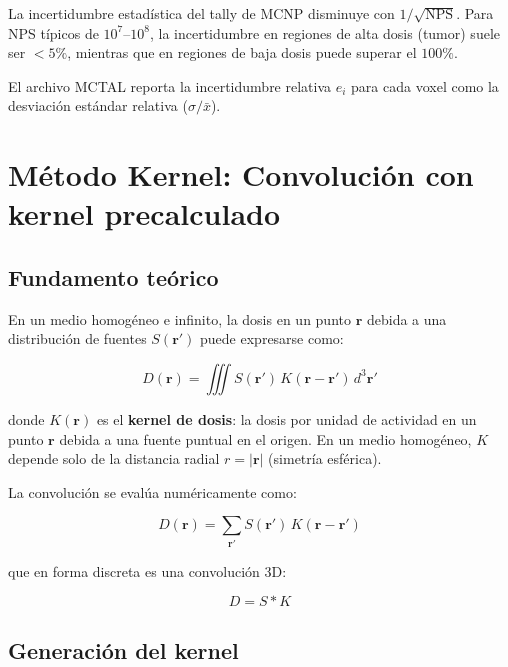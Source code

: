 \documentclass[12pt,a4paper]{article}
\begin{document}
La incertidumbre estadística del tally de MCNP disminuye con
$1/\sqrt{\text{NPS}}$. Para NPS típicos de $10^7$--$10^8$, la
incertidumbre en regiones de alta dosis (tumor) suele ser $<5\%$, mientras
que en regiones de baja dosis puede superar el $100\%$.

El archivo MCTAL reporta la incertidumbre relativa $e_i$ para cada voxel
como la desviación estándar relativa ($\sigma/\bar{x}$).

\section{Método Kernel: Convolución con kernel precalculado}

\subsection{Fundamento teórico}

En un medio homogéneo e infinito, la dosis en un punto $\mathbf{r}$ debida
a una distribución de fuentes $S(\mathbf{r}')$ puede expresarse como:

\begin{equation}
    D(\mathbf{r}) = \iiint S(\mathbf{r}') \, K(\mathbf{r} - \mathbf{r}') \, d^3\mathbf{r}'
\end{equation}

donde $K(\mathbf{r})$ es el \textbf{kernel de dosis}: la dosis por unidad
de actividad en un punto $\mathbf{r}$ debida a una fuente puntual en el
origen. En un medio homogéneo, $K$ depende solo de la distancia radial
$r = |\mathbf{r}|$ (simetría esférica).

La convolución se evalúa numéricamente como:

\begin{equation}
    D(\mathbf{r}) = \sum_{\mathbf{r}'} S(\mathbf{r}') \, K(\mathbf{r} - \mathbf{r}')
\end{equation}

que en forma discreta es una convolución 3D:

\begin{equation}
    D = S \ast K
\end{equation}

\subsection{Generación del kernel}
\end{document}
